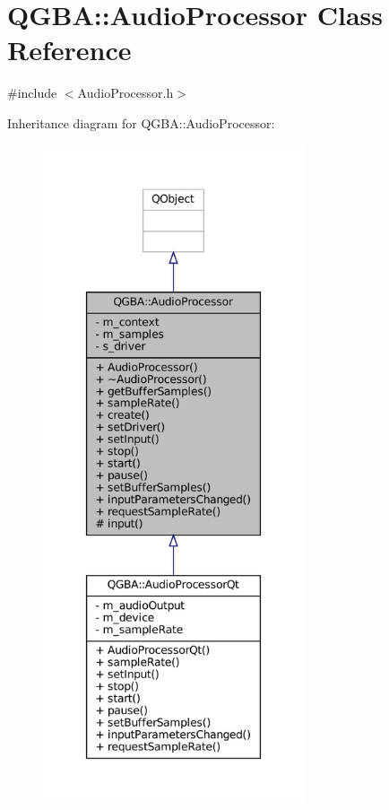 \hypertarget{class_q_g_b_a_1_1_audio_processor}{}\section{Q\+G\+BA\+:\+:Audio\+Processor Class Reference}
\label{class_q_g_b_a_1_1_audio_processor}


{\ttfamily \#include $<$Audio\+Processor.\+h$>$}



Inheritance diagram for Q\+G\+BA\+:\+:Audio\+Processor\+:
\nopagebreak
\begin{figure}[H]
\begin{center}
\leavevmode
\includegraphics[height=550pt]{class_q_g_b_a_1_1_audio_processor__inherit__graph}
\end{center}
\end{figure}


